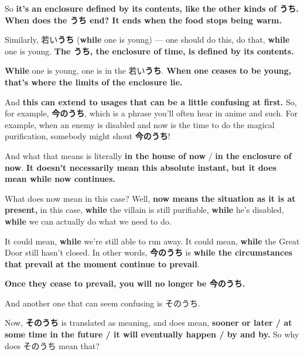 So {\bf it's an enclosure defined by its contents, like the other kinds of うち.} {\bf When does the うち end? It ends when the food stops being warm.}

{}

{}

Similarly, 若い{\bf うち} ({\bf while} one is young) --- one should do this, do that, {\bf while} one is young. {\bf The うち, the enclosure of time, is defined by its contents.}

{\bf While} one is young, one is in the 若い{\bf うち}. {\bf When one ceases to be young, that's where the limits of the enclosure lie.}

\startsectionlevel[title={今のうち},reference={今のうち}]

And {\bf this can extend to usages that can be a little confusing at first.} So, for example, {\bf 今のうち}, which is a phrase you'll often hear in anime and such. For example, when an enemy is disabled and now is the time to do the magical purification, somebody might shout {\bf 今のうち}!

{}

And what that means is literally {\bf in the house of now} / {\bf in the enclosure of now}. {\bf It doesn't necessarily mean this absolute instant,} {\bf but it does mean while now continues.}

\thinrule

What does now mean in this case? Well, {\bf now means the situation as it is at present,} in this case, {\bf while} the villain is still purifiable, {\bf while} he's disabled, {\bf while} we can actually do what we need to do.

It could mean, {\bf while} we're still able to run away. It could mean, {\bf while} the Great Door still hasn't closed. In other words, {\bf 今のうち} is {\bf while the circumstances that prevail at the moment continue to prevail}.

{\bf Once they cease to prevail, you will no longer be 今のうち.}

\stopsectionlevel

\startsectionlevel[title={そのうち},reference={そのうち}]

And another one that can seem confusing is そのうち.

{}

Now, {\bf そのうち} is translated as meaning, and does mean, {\bf sooner or later / at some time in the future / it will eventually happen / by and by.} So why does そのうち mean that?

